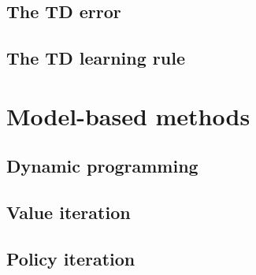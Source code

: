\documentclass[11pt]{book} %
\begin{document}
\subsection{The TD error}
\subsection{The TD learning rule}

\section{Model-based methods}
\subsection{Dynamic programming}
\subsection{Value iteration}
\subsection{Policy iteration}



\backmatter
\end{document}
